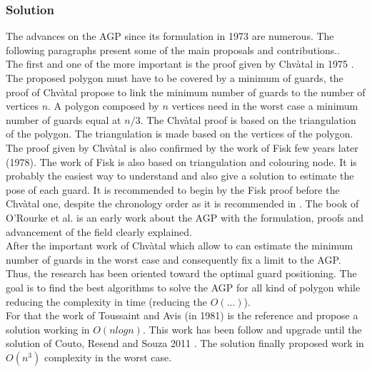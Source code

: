 	\subsubsection{Solution }
	
	The advances on the AGP since its formulation in 1973 are numerous. The following paragraphs present some of the main proposals and contributions..\\
	 The first and one of the more important is the proof given by Chvàtal in 1975 \cite{44*chvatal1975}.  The proposed polygon must have to be covered by a minimum of guards, the proof of Chvàtal propose to link the minimum number of guards to the number of vertices $n$. 
A polygon composed by $n$ vertices need in the worst case a minimum number of guards equal at $n/3$. The Chvàtal proof is based on the triangulation of the polygon. The triangulation is made based on the vertices of the polygon.\\
	     The proof given by Chvàtal is also confirmed by the work of Fisk  few years later (1978). The work of Fisk is also based on triangulation and colouring node. It is probably the easiest way to understand and also give a solution to estimate the pose of each guard. It is recommended to begin by the Fisk proof before the Chvàtal one, despite the chronology order as it is recommended in \cite{219*orourke1987}. The book of O'Rourke et al. \cite{219*orourke1987} is an early work about the AGP with the formulation, proofs and advancement of the field clearly explained. \\
After the important work of Chvàtal which allow to can estimate the minimum number of guards in the worst case and consequently fix a limit to the AGP. Thus, the research has been oriented toward the optimal guard positioning. The goal is to find the best algorithms to solve the AGP for all kind of polygon while reducing the complexity in time (reducing the $O(...)$).\\
For that the work of Toussaint and Avis (in 1981) is the reference and propose a solution working in $O(n log n)$. This work has been follow and upgrade until the solution of Couto, Resend and Souza  2011 \cite{224*couto2011}. The solution  finally proposed work in $O(n^3)$ complexity in the worst case. 

